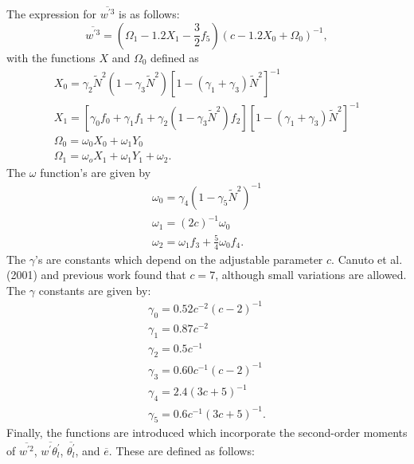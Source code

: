 The expression for $\overline{w^{'3}}$ is as follows:
%
\begin{equation}
\overline{w^{'3}}=\left(\Omega_{1}-1.2X_{1}-\frac{3}{2}f_{5}\right)\left(c-1.2X_{0}+\Omega_{0}\right)^{-1},
  \label{w3_z}
\end{equation}
%
with the functions $X$ and $\Omega_{0}$ defined as
%
\begin{equation}
  \label{Xomega_func}
  \begin{split}
    X_{0}=\gamma_{2}\tilde{N}^{2}\left(1-\gamma_{3}\tilde{N}^{2}\right)\left[1-\left(\gamma_{1}+\gamma_{3}\right)\tilde{N}^{2}\right]^{-1}\\
    X_{1}=\left[\gamma_{0}f_{0}+\gamma_{1}f_{1}+\gamma_{2}\left(1-\gamma_{3}\tilde{N}^{2}\right)f_{2}\right]\left[1-\left(\gamma_{1}+\gamma_{3}\right)\tilde{N}^{2}\right]^{-1}\\
    \Omega_{0}=\omega_{0}X_{0}+\omega_{1}Y_{0}\\
    \Omega_{1}=\omega_{o}X_{1}+\omega_{1}Y_{1}+\omega_{2}.
  \end{split}
\end{equation}
%
The $\omega$ function's are given by
%
\begin{equation}
  \label{omegas}
  \begin{split}
  \omega_{0}=\gamma_{4}\left(1-\gamma_{5}\tilde{N}^{2}\right)^{-1}\\
  \omega_{1}=\left(2c\right)^{-1}\omega_{0}\\
  \omega_{2}=\omega_{1}f_{3}+\frac{5}{4}\omega_{0}f_{4}.
  \end{split}
\end{equation}
%
The $\gamma$'s are constants which depend on the adjustable parameter $c$.  Canuto et al. (2001) and previous work found that $c=7$, although small variations are allowed.  The $\gamma$ constants are given by:
%
\begin{equation}
  \label{gammas}
  \begin{split}
  \gamma_{0}=0.52c^{-2}\left(c-2\right)^{-1}\\
  \gamma_{1}=0.87c^{-2}\\
  \gamma_{2}=0.5c^{-1}\\
  \gamma_{3}=0.60c^{-1}\left(c-2\right)^{-1}\\
  \gamma_{4}=2.4\left(3c+5\right)^{-1}\\
  \gamma_{5}=0.6c^{-1}\left(3c+5\right)^{-1}.
  \end{split}
\end{equation}
%
Finally, the functions are introduced which incorporate the second-order moments of $\overline{w^{'2}}$, $\overline{w^{'}\theta_{l}^{'}}$, $\overline{\theta_{l}^{'}}$, and $\overline{e}$.  These are defined as follows:

